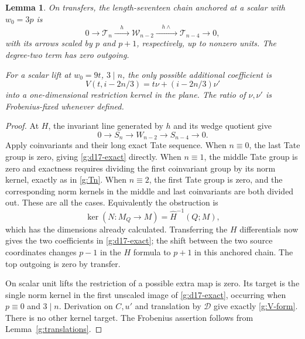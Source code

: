 \documentclass[11pt]{article}
\newtheorem{lemma}[theorem]{Lemma}
\theoremstyle{definition}
\theoremstyle{remark}
\numberwithin{equation}{section}
\begin{document}
\begin{lemma}\label{g:d17}
On transfers, the length-seventeen chain anchored at a scalar
with $w_0=3p$ is
\begin{equation}\label{g:d17-exact}
 0\longrightarrow\mathcal T_n
 \xrightarrow{\quad h\quad}\mathcal W_{n-2}
 \xrightarrow{\quad h\wedge\quad}\mathcal T_{n-4}
 \longrightarrow0,
\end{equation}
with its arrows scaled by $p$ and $p+1$, respectively, up to
nonzero units.  The degree-two term has zero outgoing.

For a scalar lift at $w_0=9t$, $3\mid n$, the only possible
additional coefficient is
\begin{equation}\label{g:V-form}
 V(t,i-2n/3)=t\nu+(i-2n/3)\nu'
\end{equation}
into a one-dimensional restriction kernel in the plane.  The
ratio of $\nu,\nu'$ is Frobenius-fixed whenever defined.
\end{lemma}

\begin{proof}
At $H$, the invariant line generated by $h$ and its wedge
quotient give
\[
 0\longrightarrow S_n\longrightarrow W_{n-2}
 \longrightarrow S_{n-4}\longrightarrow0.
\]
Apply coinvariants and their long exact Tate sequence.
When $n\equiv0$, the last Tate group is zero, giving
\eqref{g:d17-exact} directly.  When $n\equiv1$, the
middle Tate group is zero and exactness requires dividing
the first coinvariant group by its norm kernel, exactly as
in \eqref{g:Tn}.  When $n\equiv2$, the first Tate group
is zero, and the corresponding norm kernels in the middle
and last coinvariants are both divided out.  These are
all the cases.  Equivalently the obstruction is
\[
 \ker(N:M_Q\longrightarrow M)
 =\widehat H^{-1}(Q;M),
\]
which has the dimensions already calculated.  Transferring
the $H$ differentials now gives the two coefficients in
\eqref{g:d17-exact}; the shift between the two source
coordinates changes $p-1$ in the $H$ formula to $p+1$
in this anchored chain.  The top outgoing is zero by
transfer.

On scalar unit lifts the restriction of a possible extra
map is zero.  Its target is the single norm kernel in the
first unscaled image of \eqref{g:d17-exact}, occurring
when $p\equiv0$ and $3\mid n$.  Derivation on $C,u'$
and translation by $\mathcal D$ give exactly
\eqref{g:V-form}.  There is no other kernel target.
The Frobenius assertion follows from
Lemma~\ref{g:translations}.
\end{proof}
\end{document}
